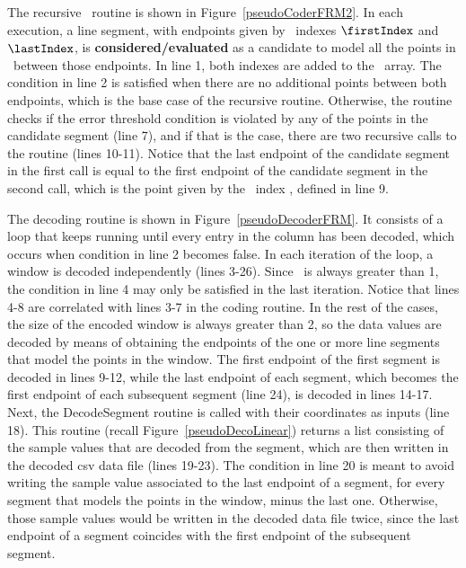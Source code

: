 The recursive \getDisplacedPointsMethod\ routine is shown in Figure~\ref{pseudoCoderFRM2}. In each execution, a line segment, with endpoints given by \window\ indexes $\firstIndex$ and $\lastIndex$, is \textbf{considered/evaluated} as a candidate to model all the points in \window\ between those endpoints. In line 1, both indexes are added to the \disPoints\ array. The condition in line 2 is satisfied when there are no additional points between both endpoints, which is the base case of the recursive routine. Otherwise, the routine checks if the error threshold condition is violated by any of the points in the candidate segment (line 7), and if that is the case, there are two recursive calls to the routine (lines 10-11). Notice that the last endpoint of the candidate segment in the first call is equal to the first endpoint of the candidate segment in the second call, which is the point given by the \window\ index \half, defined in line 9.




The decoding routine is shown in Figure~\ref{pseudoDecoderFRM}. It consists of a loop that keeps running until every entry in the column has been decoded, which occurs when condition in line 2 becomes false. In each iteration of the loop, a window is decoded independently (lines 3-26). Since \win\ is always greater than 1, the condition in line 4 may only be satisfied in the last iteration. Notice that lines 4-8 are correlated with lines 3-7 in the coding routine. In the rest of the cases, the size of the encoded window is always greater than 2, so the data values are decoded by means of obtaining the endpoints of the one or more line segments that model the points in the window. The first endpoint of the first segment is decoded in lines 9-12, while the last endpoint of each segment, which becomes the first endpoint of each subsequent segment (line 24), is decoded in lines 14-17. Next, the DecodeSegment routine is called with their coordinates as inputs (line 18). This routine (recall Figure~\ref{pseudoDecoLinear}) returns a list consisting of the sample values that are decoded from the segment, which are then written in the decoded csv data file (lines 19-23). The condition in line 20 is meant to avoid writing the sample value associated to the last endpoint of a segment, for every segment that models the points in the window, minus the last one. Otherwise, those sample values would be written in the decoded data file twice, since the last endpoint of a segment coincides with the first endpoint of the subsequent segment.



